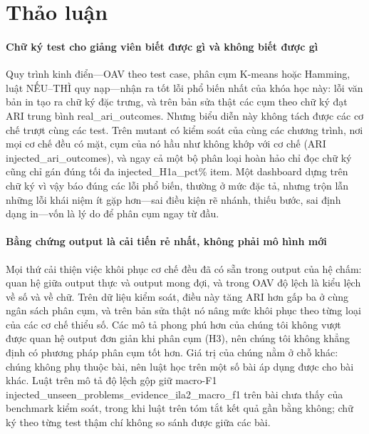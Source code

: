 \section{Thảo luận}\label{sec:discussion}

\paragraph{Chữ ký test cho giảng viên biết được gì và không biết được gì}
Quy trình kinh điển---OAV theo test case, phân cụm K-means hoặc Hamming, luật NẾU--THÌ quy nạp---nhận ra tốt lỗi phổ biến nhất của khóa học này: lỗi văn bản in tạo ra chữ ký đặc trưng, và trên bản sửa thật các cụm theo chữ ký đạt ARI trung bình {{real_ari_outcomes}}. Nhưng biểu diễn này không tách được các cơ chế trượt cùng các test. Trên mutant có kiểm soát của cùng các chương trình, nơi mọi cơ chế đều có mặt, cụm của nó hầu như không khớp với cơ chế (ARI {{injected_ari_outcomes}}), và ngay cả một bộ phân loại hoàn hảo chỉ đọc chữ ký cũng chỉ gán đúng tối đa {{injected_H1a_pct}}\% item. Một dashboard dựng trên chữ ký vì vậy báo đúng các lỗi phổ biến, thường ở mức đặc tả, nhưng trộn lẫn những lỗi khái niệm ít gặp hơn---sai điều kiện rẽ nhánh, thiếu bước, sai định dạng in---vốn là lý do để phân cụm ngay từ đầu.

\paragraph{Bằng chứng output là cải tiến rẻ nhất, không phải mô hình mới}
Mọi thứ cải thiện việc khôi phục cơ chế đều đã có sẵn trong output của hệ chấm: quan hệ giữa output thực và output mong đợi, và trong OAV độ lệch là kiểu lệch về số và về chữ. Trên dữ liệu kiểm soát, điều này tăng ARI hơn gấp ba ở cùng ngân sách phân cụm, và trên bản sửa thật nó nâng mức khôi phục theo từng loại của các cơ chế thiểu số. Các mô tả phong phú hơn của chúng tôi không vượt được quan hệ output đơn giản khi phân cụm (H3), nên chúng tôi không khẳng định có phương pháp phân cụm tốt hơn. Giá trị của chúng nằm ở chỗ khác: chúng không phụ thuộc bài, nên luật học trên một số bài áp dụng được cho bài khác. Luật trên mô tả độ lệch gộp giữ macro-F1 {{injected_unseen_problems_evidence_ila2_macro_f1}} trên bài chưa thấy của benchmark kiểm soát, trong khi luật trên tóm tắt kết quả gần bằng không; chữ ký theo từng test thậm chí không so sánh được giữa các bài.

